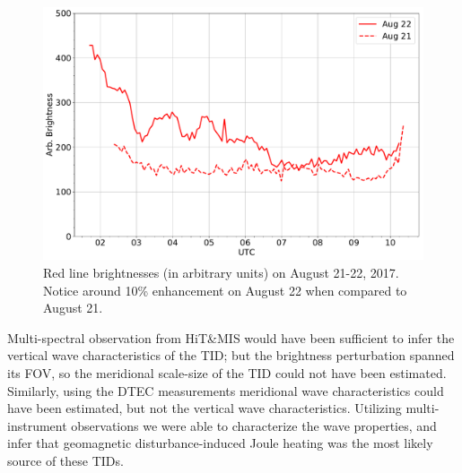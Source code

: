 \documentclass[crop=false,class=mitthesis,oneside,font=12pt]{standalone}
\begin{document}
  \begin{figure}[H]
 \centering\includegraphics[width=35pc]{supplimentary1.pdf}
 \caption{ Red line brightnesses (in arbitrary units) on August 21-22, 2017. Notice around 10\% enhancement on August 22 when compared to August 21.}
 \label{fig:supp}
 \end{figure}
 
Multi-spectral observation from HiT\&MIS would have been sufficient to infer the vertical wave characteristics of the TID; but the brightness perturbation spanned its FOV, so the meridional scale-size of the TID could not have been estimated. Similarly, using the DTEC measurements meridional wave characteristics could have been estimated, but not the vertical wave characteristics. Utilizing multi-instrument observations we were able to characterize the wave properties, and infer that geomagnetic disturbance-induced Joule heating was the most likely source of these TIDs.
% 
% 
% 
%
% 
% 
% 
%
% 
% 
\end{document}
